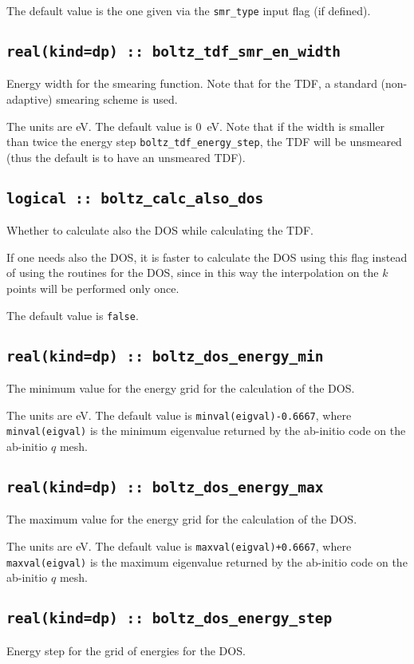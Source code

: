 The default value is the one given via the {\tt smr\_type} input flag (if defined).

\subsection[boltz\_tdf\_smr\_en\_width]{\tt real(kind=dp) :: boltz\_tdf\_smr\_en\_width}
Energy width for the smearing function. Note that for the TDF, a standard (non-adaptive) smearing scheme is used.

The units are eV.
The default value is 0~eV. Note that if the width is smaller than twice the energy step {\tt boltz\_tdf\_energy\_step}, the TDF will be unsmeared (thus the default is to have an unsmeared TDF).

\subsection[boltz\_calc\_also\_dos]{\tt logical :: boltz\_calc\_also\_dos}
Whether to calculate also the DOS while calculating the TDF.

If one needs also the DOS, it is faster to calculate the DOS using this flag instead of using the routines for the DOS, since in this way the interpolation on the $k$ points will be performed only once.

The default value is \verb#false#.

\subsection[boltz\_dos\_energy\_min]{\tt real(kind=dp) :: boltz\_dos\_energy\_min}
The minimum value for the energy grid for the calculation of the DOS.

The units are eV.
The default value is {\tt minval(eigval)-0.6667}, where  {\tt minval(eigval)} is the minimum eigenvalue returned by the ab-initio code on the ab-initio $q$ mesh.

\subsection[boltz\_dos\_energy\_max]{\tt real(kind=dp) :: boltz\_dos\_energy\_max}
The maximum value for the energy grid for the calculation of the DOS.

The units are eV.
The default value is {\tt maxval(eigval)+0.6667}, where  {\tt maxval(eigval)} is the maximum eigenvalue returned by the ab-initio code on the ab-initio $q$ mesh.

\subsection[boltz\_dos\_energy\_step]{\tt real(kind=dp) :: boltz\_dos\_energy\_step}
Energy step for the grid of energies for the DOS.

